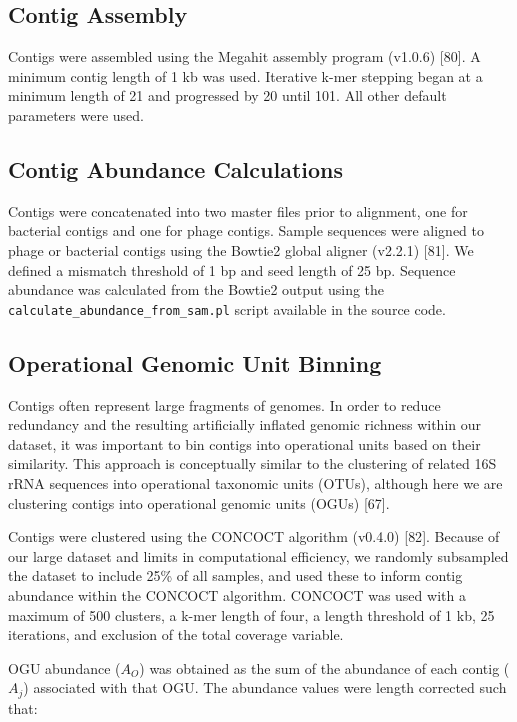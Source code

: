 \documentclass[12pt,]{article}
\begin{document}
\subsection{Contig Assembly}\label{contig-assembly}

Contigs were assembled using the Megahit assembly program (v1.0.6)
{[}80{]}. A minimum contig length of 1 kb was used. Iterative k-mer
stepping began at a minimum length of 21 and progressed by 20 until 101.
All other default parameters were used.

\subsection{Contig Abundance
Calculations}\label{contig-abundance-calculations}

Contigs were concatenated into two master files prior to alignment, one
for bacterial contigs and one for phage contigs. Sample sequences were
aligned to phage or bacterial contigs using the Bowtie2 global aligner
(v2.2.1) {[}81{]}. We defined a mismatch threshold of 1 bp and seed
length of 25 bp. Sequence abundance was calculated from the Bowtie2
output using the \texttt{calculate\_abundance\_from\_sam.pl} script
available in the source code.

\subsection{Operational Genomic Unit
Binning}\label{operational-genomic-unit-binning}

Contigs often represent large fragments of genomes. In order to reduce
redundancy and the resulting artificially inflated genomic richness
within our dataset, it was important to bin contigs into operational
units based on their similarity. This approach is conceptually similar
to the clustering of related 16S rRNA sequences into operational
taxonomic units (OTUs), although here we are clustering contigs into
operational genomic units (OGUs) {[}67{]}.

Contigs were clustered using the CONCOCT algorithm (v0.4.0) {[}82{]}.
Because of our large dataset and limits in computational efficiency, we
randomly subsampled the dataset to include 25\% of all samples, and used
these to inform contig abundance within the CONCOCT algorithm. CONCOCT
was used with a maximum of 500 clusters, a k-mer length of four, a
length threshold of 1 kb, 25 iterations, and exclusion of the total
coverage variable.

OGU abundance (\(A_{O}\)) was obtained as the sum of the abundance of
each contig (\(A_{j}\)) associated with that OGU. The abundance values
were length corrected such that:
\end{document}
